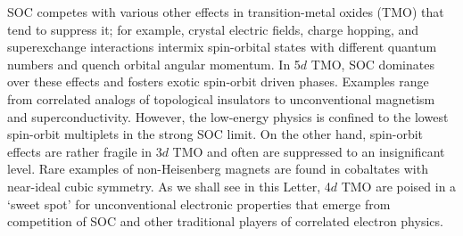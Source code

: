 \noindent
SOC competes with various other effects in transition-metal oxides (TMO) that tend to suppress it; for example, crystal electric fields, charge hopping, and superexchange interactions intermix spin-orbital states with different quantum numbers and quench orbital angular momentum. In 5$d$ TMO, SOC dominates over these effects and fosters exotic spin-orbit driven phases. Examples range from correlated analogs of topological insulators to unconventional magnetism  and superconductivity. However, the low-energy physics is confined to the lowest spin-orbit multiplets in the strong SOC limit. On the other hand, spin-orbit effects are rather fragile in 3$d$ TMO and often are suppressed to an insignificant level. Rare examples of non-Heisenberg magnets are found in cobaltates with near-ideal cubic symmetry. As we shall see in this Letter, 4$d$ TMO are poised in a `sweet spot' for unconventional electronic properties that emerge from competition of SOC and other traditional players of correlated electron physics.